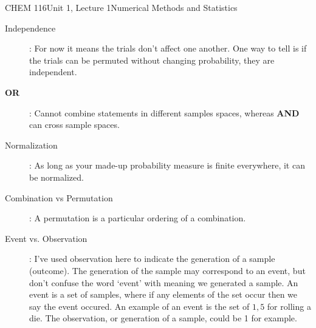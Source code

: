 \documentclass{article}
\begin{document}
\begin{tdoc}{CHEM 116}{Unit 1, Lecture 1}{Numerical Methods and Statistics}
\begin{description}

\item [Independence]: For now it means the trials don't affect one
another. One way to tell is if the trials can be permuted without changing probability, they are
independent.\vspace{0.2cm}\\

\item[{\bf OR}]: Cannot combine statements in different samples spaces, whereas {\bf AND} can cross sample spaces.\vspace{0.2cm}\\

\item[Normalization]: As long as your made-up probability measure is
finite everywhere, it can be normalized.

\item[Combination vs Permutation]: A permutation is a particular
  ordering of a combination.

\item[Event vs. Observation]: I've used observation here to indicate
  the generation of a sample (outcome). The generation of the sample
  may correspond to an event, but don't confuse the word `event' with
  meaning we generated a sample. An event is a set of samples, where
  if any elements of the set occur then we say the event occured. An
  example of an event is the set of ${1,5}$ for rolling a die. The
  observation, or generation of a sample, could be 1 for example.

\end{description}

\end{tdoc}
\end{document}
